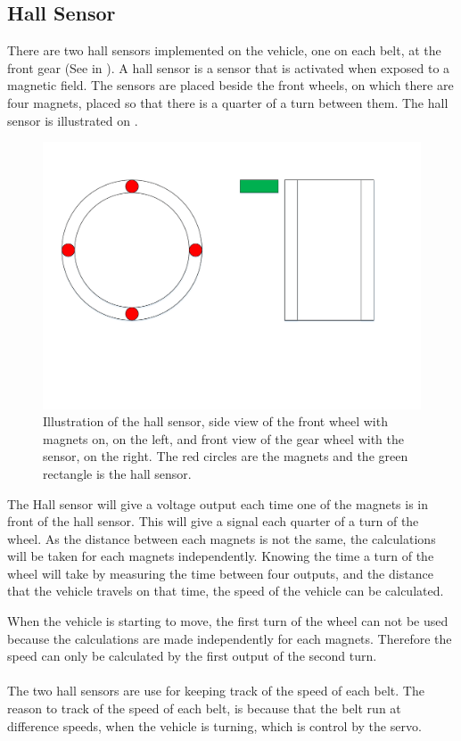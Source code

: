 \subsection{Hall Sensor}
There are two hall sensors implemented on the vehicle, one on each belt, at the front gear (See  in \secref{}). A hall sensor is a sensor that is activated when exposed to a magnetic field. The sensors are placed beside the front wheels, on which there are four magnets, placed so that there is a quarter of a turn between them. The hall sensor is illustrated on .

 \begin{figure}[H]
	\centering
	\includegraphics[scale=0.5]{figures/HallSensorSide_Forward_view.pdf}
	\caption{Illustration of the hall sensor, side view of the front wheel with magnets on, on the left, and front view of the gear wheel with the sensor, on the right. The red circles are the magnets and the green rectangle is the hall sensor.}
	\label{HallSensor}
\end{figure}

The Hall sensor will give a voltage output each time one of the magnets is in front of the hall sensor. This will give a signal each quarter of a turn of the wheel. As the distance between each magnets is not the same, the calculations will be taken for each magnets independently.
Knowing the time a turn of the wheel will take by measuring the time between four outputs, and the distance that the vehicle travels on that time, the speed of the vehicle can be calculated.

When the vehicle is starting to move, the first turn of the wheel can not be used because the calculations are made independently for each magnets. Therefore the speed can only be calculated by the first output of the second turn.\\\\

The two hall sensors are use for keeping track of the speed of each belt. The reason to track of the speed of each belt, is because that the belt run at difference speeds, when the vehicle is turning, which is control by the servo.